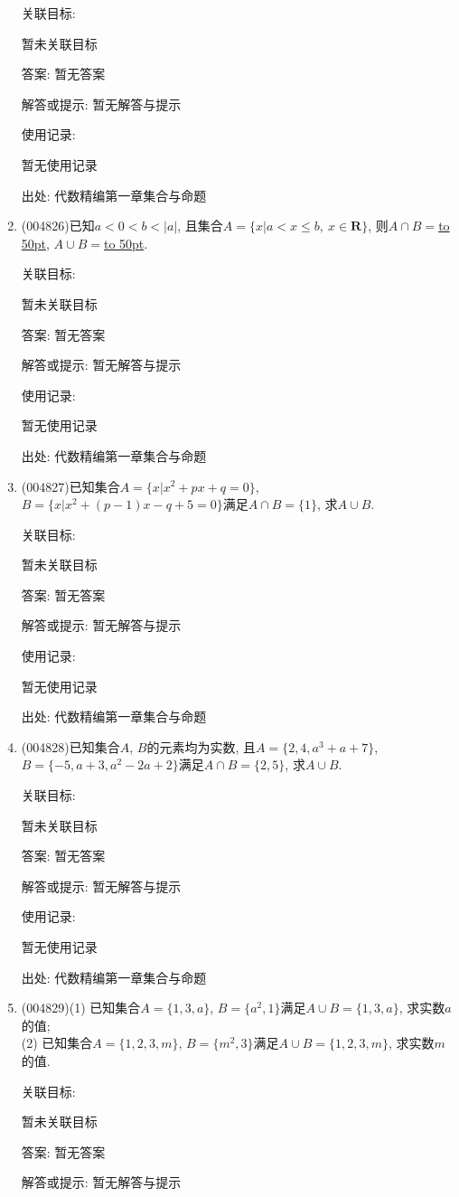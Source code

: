 \documentclass[10pt,a4paper]{article}
\newcommand{\blank}[1]{\underline{\hbox to #1pt{}}}
\begin{document}
\begin{enumerate}[1.]
关联目标:

暂未关联目标

答案: 暂无答案

解答或提示: 暂无解答与提示

使用记录:

暂无使用记录


出处: 代数精编第一章集合与命题
\item { (004826)}已知$a<0<b<|a|$, 且集合$A=\{x|a<x\le b, \ x\in \mathbf{R}\}$, 则$A\cap B=$\blank{50}, $A\cup B=$\blank{50}.


关联目标:

暂未关联目标

答案: 暂无答案

解答或提示: 暂无解答与提示

使用记录:

暂无使用记录


出处: 代数精编第一章集合与命题
\item { (004827)}已知集合$A=\{x|x^2+px+q=0\}$, $B=\{x|x^2+(p-1)x-q+5=0\}$满足$A\cap B=\{1\}$, 求$A\cup B$.


关联目标:

暂未关联目标

答案: 暂无答案

解答或提示: 暂无解答与提示

使用记录:

暂无使用记录


出处: 代数精编第一章集合与命题
\item { (004828)}已知集合$A$, $B$的元素均为实数, 且$A=\{2,4,a^3+a+7\}$, $B=\{-5,a+3,a^2-2a+2\}$满足$A\cap B=\{2,5\}$, 求$A\cup B$.


关联目标:

暂未关联目标

答案: 暂无答案

解答或提示: 暂无解答与提示

使用记录:

暂无使用记录


出处: 代数精编第一章集合与命题
\item { (004829)}(1) 已知集合$A=\{1,3,a\}$, $B=\{a^2,1\}$满足$A\cup B=\{1,3,a\}$, 求实数$a$的值;\\
(2) 已知集合$A=\{1,2,3,m\}$, $B=\{m^2,3\}$满足$A\cup B=\{1,2,3,m\}$, 求实数$m$的值.


关联目标:

暂未关联目标

答案: 暂无答案

解答或提示: 暂无解答与提示


\end{enumerate}
\end{document}
